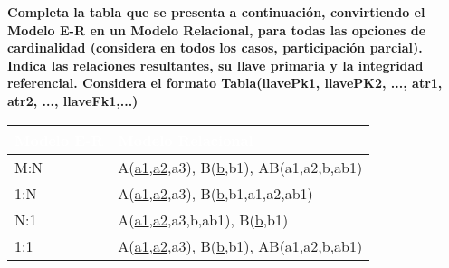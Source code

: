 \textbf{Completa la tabla que se presenta a continuación, convirtiendo el Modelo E-R en un Modelo Relacional, para todas
las opciones de cardinalidad (considera en todos los casos, participación parcial). Indica las relaciones resultantes,
su llave primaria y la integridad referencial. Considera el formato Tabla(llavePk1, llavePK2, ..., atr1, atr2, ..., llaveFk1,...)}\vspace{.3cm}

\begin{table}[H]
    \centering
    \renewcommand{\arraystretch}{1.5} %
    \setlength{\tabcolsep}{12pt} %
    
    \begin{tabular}{|>{\centering\arraybackslash}p{2.5cm}|>{\centering\arraybackslash}p{8cm}|}
    \hline
    \rowcolor{blue!90} \textcolor{white}{\textbf{Modelo E-R}} & \textcolor{white}{\textbf{Modelo Relacional}} \\ \hline
    \rowcolor{blue!20} M:N & A(\underline{a1},\underline{a2},a3), B(\underline{b},b1), AB(a1,a2,b,ab1) \\ \hline
    \rowcolor{white} 1:N &  A(\underline{a1},\underline{a2},a3), B(\underline{b},b1,a1,a2,ab1) \\ \hline
    \rowcolor{blue!20} N:1 & A(\underline{a1},\underline{a2},a3,b,ab1), B(\underline{b},b1) \\ \hline
    \rowcolor{white} 1:1 &  A(\underline{a1},\underline{a2},a3), B(\underline{b},b1), AB(a1,a2,b,ab1) \\ \hline
    \end{tabular}
    
\end{table}
